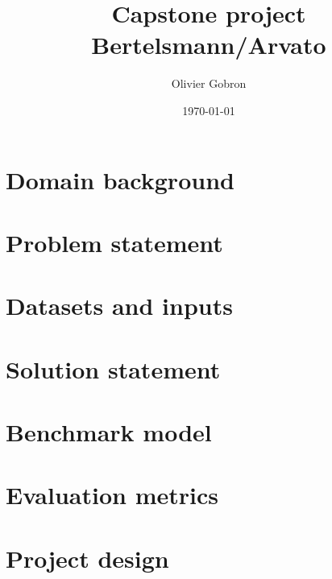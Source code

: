 \documentclass[dvips,12pt]{article}
\begin{document}
\title{%
  Capstone project \\
  \large Bertelsmann/Arvato}
\author{Olivier Gobron}
\date{\today}


\maketitle


\section{Domain background}

\section{Problem statement}

\section{Datasets and inputs}

\section{Solution statement}

\section{Benchmark model}

\section{Evaluation metrics}

\section{Project design}
\end{document}
